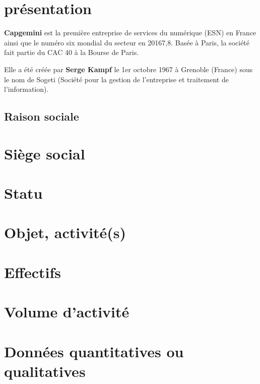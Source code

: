 \documentclass[a4paper, 12pt,french,oneside]{book}%
\theoremstyle{definition}
\theoremstyle{remark}
\begin{document}
\section{présentation}
\textbf{Capgemini} est la première entreprise de services du numérique (ESN) en France ainsi que le numéro six mondial du secteur en 20167,8. Basée à Paris, la société fait partie du CAC 40 à la Bourse de Paris.

Elle a été créée par\textbf{ Serge Kampf }le 1er octobre 1967 à Grenoble (France) sous le nom de Sogeti (Société pour la gestion de l'entreprise et traitement de l'information).
\subsection{Raison sociale}
\section{Siège social}
\section{Statu}
\section{Objet, activité(s)}
\section{Effectifs }
\section{Volume d’activité}
\section{Données quantitatives ou qualitatives}
\end{document}
